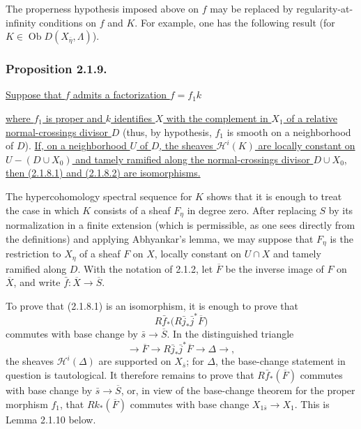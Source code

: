 The properness hypothesis imposed above on $f$ may be replaced by
regularity-at-infinity conditions on $f$ and $K$.  For example, one has
the following result (for
$K\in\operatorname{Ob}D(X_{\bar\eta},\Lambda)$).

\subsubsection*{Proposition 2.1.9.}
\underline{Suppose that $f$ admits a factorization $f=f_1k$}
\begin{center}
\end{center}
\underline{where $f_1$ is proper and $k$ identifies $X$ with the
complement in $X_1$ of a relative normal-crossings divisor $D$}
(thus, by hypothesis, $f_1$ is smooth on a neighborhood of $D$).
\underline{If, on a neighborhood $U$ of $D$, the sheaves
$\mathcal H^i(K)$ are locally constant on $U-(D\cup X_0)$ and tamely
ramified along the normal-crossings divisor $D\cup X_0$, then
(2.1.8.1) and (2.1.8.2) are isomorphisms.}

The hypercohomology spectral sequence for $K$ shows that it is enough
to treat the case in which $K$ consists of a sheaf $F_\eta$ in degree
zero.  After replacing $S$ by its normalization in a finite extension
(which is permissible, as one sees directly from the definitions) and
applying Abhyankar's lemma, we may suppose that $F_\eta$ is the
restriction to $X_\eta$ of a sheaf $F$ on $X$, locally constant on
$U\cap X$ and tamely ramified along $D$.  With the notation of 2.1.2,
let $\overline F$ be the inverse image of $F$ on $\overline X$, and
write $\bar f:\overline X\longrightarrow\overline S$.

To prove that (2.1.8.1) is an isomorphism, it is enough to prove that
\[
R\bar f_*\bigl(R\bar j_*\bar j^*\overline F\bigr)
\]
commutes with base change by $\bar s\longrightarrow\overline S$.  In
the distinguished triangle
\[
\longrightarrow\overline F\longrightarrow
R\bar j_*\bar j^*\overline F\longrightarrow\Delta\longrightarrow,
\]
the sheaves $\mathcal H^i(\Delta)$ are supported on $X_{\bar s}$; for
$\Delta$, the base-change statement in question is tautological.  It
therefore remains to prove that $R\bar f_*(\overline F)$ commutes with
base change by $\bar s\longrightarrow\overline S$, or, in view of the
base-change theorem for the proper morphism $f_1$, that
$Rk_*(\overline F)$ commutes with base change
$X_{1\bar s}\longrightarrow X_1$.  This is Lemma 2.1.10 below.

